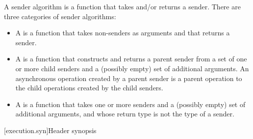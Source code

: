\pnum
A sender algorithm is a function that takes and/or returns a sender.
There are three categories of sender algorithms:
\begin{itemize}
\item
A  is a function
that takes non-senders as arguments and that returns a sender.
\item
A  is a function
that constructs and returns a parent sender
from a set of one or more child senders and
a (possibly empty) set of additional arguments.
An asynchronous operation created by a parent sender is
a parent operation to the child operations created by the child senders.
\item
A  is a function
that takes one or more senders and
a (possibly empty) set of additional arguments, and
whose return type is not the type of a sender.
\end{itemize}

[execution.syn]{Header  synopsis}

